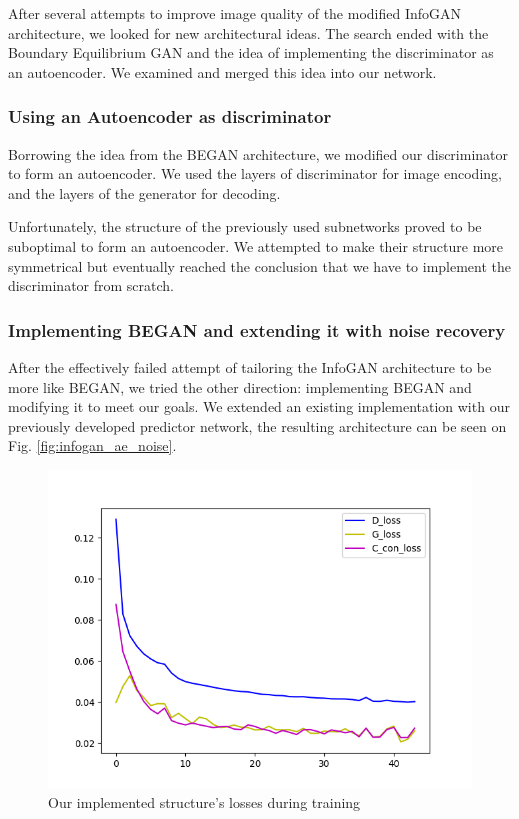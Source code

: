 \documentclass{egpubl}
\begin{document}
After several attempts to improve image quality of the modified InfoGAN architecture, we looked for new architectural ideas. The search ended with the Boundary Equilibrium GAN and the idea of implementing the discriminator as an autoencoder. We examined and merged this idea into our network.

\subsubsection{Using an Autoencoder as discriminator}

Borrowing the idea from the BEGAN architecture, we modified our discriminator to form an autoencoder. We used the layers of discriminator for image encoding, and the layers of the generator for decoding. 

Unfortunately, the structure of the previously used subnetworks proved to be suboptimal to form an autoencoder. We attempted to make their structure more symmetrical but eventually reached the conclusion that we have to implement the discriminator from scratch.

\subsubsection{Implementing BEGAN and extending it with noise recovery}

After the effectively failed attempt of tailoring the InfoGAN architecture to be more like BEGAN, we tried the other direction: implementing BEGAN and modifying it to meet our goals. We extended an existing implementation with our previously developed predictor network, the resulting architecture can be seen on Fig. \ref{fig:infogan_ae_noise}.

\begin{figure}[!htb]
	\centering
	\includegraphics[width=\linewidth]{pic/InfoBegan(proper)}
	\caption{Our implemented structure's losses during training}
\end{figure}
\end{document}
